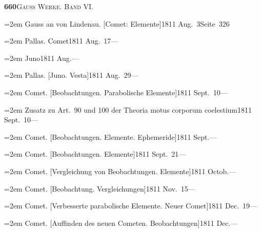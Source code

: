 \documentclass[12pt,a4paper]{article}
\begin{document}
{{{{{\newpage

\begin{center}\small\textbf{660}\quad\textsc{Gauss Werke. Band VI.}\end{center}

\vspace{0.3cm}

{\small
\noindent\hangindent=2em
Gauss an von Lindenau. [Comet: Elemente]\hfill 1811 Aug.\ 3\quad Seite\ 326

\vspace{0.5mm}
\noindent\hangindent=2em
Pallas. Comet\hfill 1811 Aug.\ 17\quad ---

\vspace{0.5mm}
\noindent\hangindent=2em
Juno\hfill 1811 Aug.\quad ---

\vspace{0.5mm}
\noindent\hangindent=2em
Pallas. [Juno. Vesta]\hfill 1811 Aug.\ 29\quad ---

\vspace{0.5mm}
\noindent\hangindent=2em
Comet. [Beobachtungen. Parabolische Elemente]\hfill 1811 Sept.\ 10\quad ---

\vspace{0.5mm}
\noindent\hangindent=2em
Zusatz zu Art.\ 90 und 100 der Theoria motus corporum coelestium\hfill 1811 Sept.\ 10\quad ---

\vspace{0.5mm}
\noindent\hangindent=2em
Comet. [Beobachtungen. Elemente. Ephemeride]\hfill 1811 Sept.\quad ---

\vspace{0.5mm}
\noindent\hangindent=2em
Comet. [Beobachtungen. Elemente]\hfill 1811 Sept.\ 21\quad ---

\vspace{0.5mm}
\noindent\hangindent=2em
Comet. [Vergleichung von Beobachtungen. Elemente]\hfill 1811 Octob.\quad ---

\vspace{0.5mm}
\noindent\hangindent=2em
Comet. [Beobachtung. Vergleichungen]\hfill 1811 Nov.\ 15\quad ---

\vspace{0.5mm}
\noindent\hangindent=2em
Comet. [Verbesserte parabolische Elemente. Neuer Comet]\hfill 1811 Dec.\ 19\quad ---

\vspace{0.5mm}
\noindent\hangindent=2em
Comet. [Auffinden des neuen Cometen. Beobachtungen]\hfill 1811 Dec.\quad ---

}}}}}}
\end{document}
